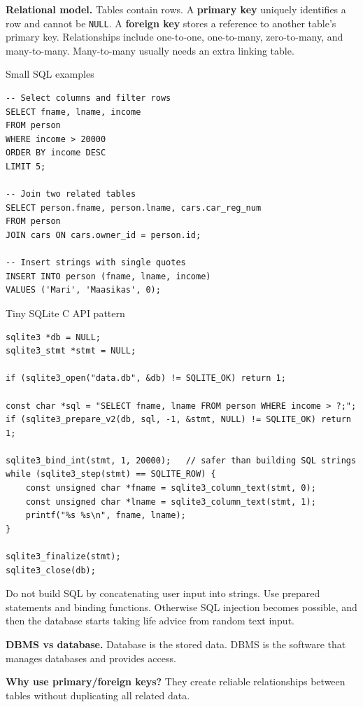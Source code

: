 \documentclass[9pt,a4paper]{article}
\newcommand{\code}[1]{\texttt{#1}}
\begin{document}
\textbf{Relational model.} Tables contain rows. A \textbf{primary key} uniquely identifies a row and cannot be \code{NULL}. A \textbf{foreign key} stores a reference to another table's primary key. Relationships include one-to-one, one-to-many, zero-to-many, and many-to-many. Many-to-many usually needs an extra linking table.

\begin{codebox}{Small SQL examples}
\begin{lstlisting}[style=sqlstyle]
-- Select columns and filter rows
SELECT fname, lname, income
FROM person
WHERE income > 20000
ORDER BY income DESC
LIMIT 5;

-- Join two related tables
SELECT person.fname, person.lname, cars.car_reg_num
FROM person
JOIN cars ON cars.owner_id = person.id;

-- Insert strings with single quotes
INSERT INTO person (fname, lname, income)
VALUES ('Mari', 'Maasikas', 0);
\end{lstlisting}
\end{codebox}

\begin{codebox}{Tiny SQLite C API pattern}
\begin{lstlisting}[style=cstyle]
sqlite3 *db = NULL;
sqlite3_stmt *stmt = NULL;

if (sqlite3_open("data.db", &db) != SQLITE_OK) return 1;

const char *sql = "SELECT fname, lname FROM person WHERE income > ?;";
if (sqlite3_prepare_v2(db, sql, -1, &stmt, NULL) != SQLITE_OK) return 1;

sqlite3_bind_int(stmt, 1, 20000);   // safer than building SQL strings
while (sqlite3_step(stmt) == SQLITE_ROW) {
    const unsigned char *fname = sqlite3_column_text(stmt, 0);
    const unsigned char *lname = sqlite3_column_text(stmt, 1);
    printf("%s %s\n", fname, lname);
}

sqlite3_finalize(stmt);
sqlite3_close(db);
\end{lstlisting}
\end{codebox}

\begin{danger}
Do not build SQL by concatenating user input into strings. Use prepared statements and binding functions. Otherwise SQL injection becomes possible, and then the database starts taking life advice from random text input.
\end{danger}

\begin{exam}
\textbf{DBMS vs database.} Database is the stored data. DBMS is the software that manages databases and provides access.\par
\textbf{Why use primary/foreign keys?} They create reliable relationships between tables without duplicating all related data.
\end{exam}
\end{document}
